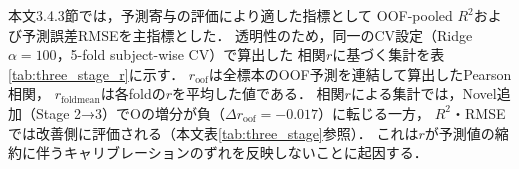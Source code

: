 \documentclass[dvipdfmx,11pt,a4paper]{bxjsarticle}
\renewcommand{\_}{\paperorigunderscore\allowbreak}%
\begin{document}
本文3.4.3節では，予測寄与の評価により適した指標として
OOF-pooled $R^2$および予測誤差RMSEを主指標とした．
透明性のため，同一のCV設定（Ridge $\alpha=100$，5-fold subject-wise CV）で算出した
相関$r$に基づく集計を表\ref{tab:three_stage_r}に示す．
$r_{\text{oof}}$は全標本のOOF予測を連結して算出したPearson相関，
$r_{\text{foldmean}}$は各foldの$r$を平均した値である．
相関$r$による集計では，Novel追加（Stage 2→3）でOの増分が負（$\Delta r_{\text{oof}} = -0.017$）に転じる一方，
$R^2$・RMSEでは改善側に評価される（本文表\ref{tab:three_stage}参照）．
これは$r$が予測値の縮約に伴うキャリブレーションのずれを反映しないことに起因する．

\begin{table}[htbp]
\centering
\caption{3段階Ridge回帰比較（相関$r$版・参考）．
$r_{\text{oof}}$はOOF予測連結によるPearson相関，
$r_{\text{foldmean}}$は5-fold平均，$\Delta r_{\text{oof}}$は隣接ステージ間の増分．}
\label{tab:three_stage_r}

\end{table}







\end{document}

